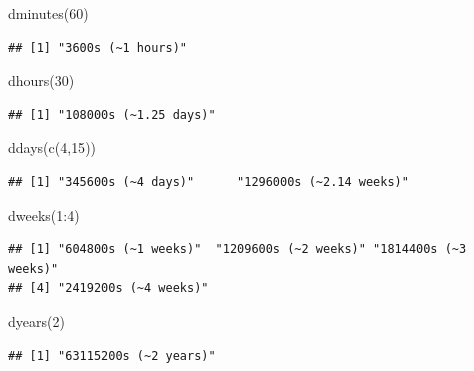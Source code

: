 \documentclass[
]{book}
\newenvironment{Shaded}{\begin{snugshade}}{\end{snugshade}}
\newcommand{\DecValTok}[1]{\textcolor[rgb]{0.00,0.00,0.81}{#1}}
\newcommand{\FunctionTok}[1]{\textcolor[rgb]{0.00,0.00,0.00}{#1}}
\newcommand{\NormalTok}[1]{#1}
\newcommand{\SpecialCharTok}[1]{\textcolor[rgb]{0.00,0.00,0.00}{#1}}
\begin{document}
\begin{Shaded}
\begin{Highlighting}[]
\FunctionTok{dminutes}\NormalTok{(}\DecValTok{60}\NormalTok{)}
\end{Highlighting}
\end{Shaded}

\begin{verbatim}
## [1] "3600s (~1 hours)"
\end{verbatim}

\begin{Shaded}
\begin{Highlighting}[]
\FunctionTok{dhours}\NormalTok{(}\DecValTok{30}\NormalTok{)}
\end{Highlighting}
\end{Shaded}

\begin{verbatim}
## [1] "108000s (~1.25 days)"
\end{verbatim}

\begin{Shaded}
\begin{Highlighting}[]
\FunctionTok{ddays}\NormalTok{(}\FunctionTok{c}\NormalTok{(}\DecValTok{4}\NormalTok{,}\DecValTok{15}\NormalTok{))}
\end{Highlighting}
\end{Shaded}

\begin{verbatim}
## [1] "345600s (~4 days)"      "1296000s (~2.14 weeks)"
\end{verbatim}

\begin{Shaded}
\begin{Highlighting}[]
\FunctionTok{dweeks}\NormalTok{(}\DecValTok{1}\SpecialCharTok{:}\DecValTok{4}\NormalTok{)}
\end{Highlighting}
\end{Shaded}

\begin{verbatim}
## [1] "604800s (~1 weeks)"  "1209600s (~2 weeks)" "1814400s (~3 weeks)"
## [4] "2419200s (~4 weeks)"
\end{verbatim}

\begin{Shaded}
\begin{Highlighting}[]
\FunctionTok{dyears}\NormalTok{(}\DecValTok{2}\NormalTok{)}
\end{Highlighting}
\end{Shaded}

\begin{verbatim}
## [1] "63115200s (~2 years)"
\end{verbatim}
\end{document}
